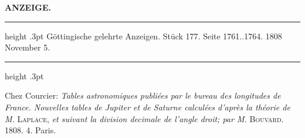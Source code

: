 \clearpage
\thispagestyle{empty}
\noindent{}%
%
\parbox[t]{\dimexpr\linewidth-24mm\relax}{\centering\footnotesize\bfseries ANZEIGE.\par}%
\makebox[12mm][r]{{}}\par\medskip
{}
\begin{center}\parbox{.85\linewidth}{\centering\small
\hrule height .3pt\relax\vspace{2.5pt}
Göttingische gelehrte Anzeigen. Stück 177. Seite 1761..1764. 1808 November 5.\par
\vspace{2.5pt}\hrule height .3pt\relax
}\end{center}

Chez Courcier: \emph{Tables astronomiques publiées par le bureau des longitudes de France. Nouvelles tables de Jupiter et de Saturne calculées d'après la théorie de M. }\textsc{Laplace}, \emph{et suivant la division decimale de l'angle droit; par M.} \textsc{Bouvard}. 1808. 4. Paris.

